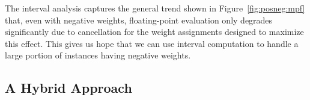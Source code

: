 \documentclass[letterpaper,USenglish,cleveref, autoref, thm-restate]{lipics-v2021}
\begin{document}
The interval analysis captures the general trend shown in
Figure~\ref{fig:posneg:mpf} that, even with negative
weights, floating-point evaluation only degrades significantly due to cancellation
for the weight assignments designed to maximize
this effect.  This gives us hope that we can use interval computation
to handle a large portion of instances having negative weights.

\subsection{A Hybrid Approach}
\label{sect:hybrid}

\begin{table}
  \caption{Performance Comparison of Different Implementation Strategies.  Run entries of the form $S$+$F$ indicate that $S$ runs
  were successful and $F$ runs either ran out of memory or failed to meet the target precision.  Our hybrid strategy is shown in red.}
  \label{tab:compare}
\end{table}
\end{document}
